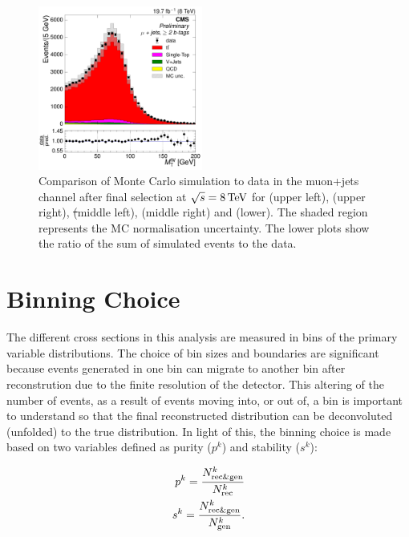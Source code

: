 \begin{figure}[hbtp]
     \includegraphics[width=0.48\textwidth]{Chapters/04_Analysis/04b_XSections/images/control_plots/before_fit/8TeV/MuPlusJets_patType1CorrectedPFMet_MT_2orMoreBtags_with_ratio.pdf}\hfill
     \caption[Comparison of Monte Carlo simulation to data in the muon+jets channel after final
     selection at $\roots=8\TeV$.]{Comparison of Monte Carlo simulation to data in the muon+jets channel after
     final selection at $\roots=8\TeV$ for \met (upper left), \HT (upper right), \st (middle left), \wpt (middle
     right) and \mt (lower). The shaded region represents the \ttbar MC normalisation uncertainty. The lower
     plots show the ratio of the sum of simulated events to the data.}
     \label{fig:data_mc_comparison_8TeV_muon}
\end{figure}


\section{Binning Choice}
\label{s:binning_choice}
The different cross sections in this analysis are measured in bins of the primary variable distributions. The
choice of bin sizes and boundaries are significant because events generated in one bin can migrate to another
bin after reconstrution due to the finite resolution of the detector. This altering of the number of events,
as a result of events moving into, or out of, a bin is important to understand so that the final reconstructed
distribution can be deconvoluted (unfolded) to the true distribution. In light of this, the binning choice is
made based on two variables defined as purity ($p^k$) and stability ($s^k$):

\begin{align}
\label{eq:purity_and_stability}
p^k = \frac{N_{\mathrm{rec}\&\mathrm{gen}}^k}{N_{\mathrm{rec}}^k}\\
s^k = \frac{N_{\mathrm{rec}\&\mathrm{gen}}^k}{N_{\mathrm{gen}}^k}.
\end{align}

